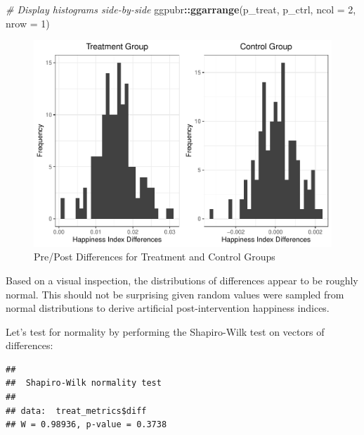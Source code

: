 \documentclass[]{book}
\newenvironment{Shaded}{\begin{snugshade}}{\end{snugshade}}
\newcommand{\CommentTok}[1]{\textcolor[rgb]{0.56,0.35,0.01}{\textit{#1}}}
\newcommand{\DataTypeTok}[1]{\textcolor[rgb]{0.13,0.29,0.53}{#1}}
\newcommand{\DecValTok}[1]{\textcolor[rgb]{0.00,0.00,0.81}{#1}}
\newcommand{\KeywordTok}[1]{\textcolor[rgb]{0.13,0.29,0.53}{\textbf{#1}}}
\newcommand{\NormalTok}[1]{#1}
\newcommand{\OperatorTok}[1]{\textcolor[rgb]{0.81,0.36,0.00}{\textbf{#1}}}
\begin{document}
\begin{Shaded}
\begin{Highlighting}[]
\CommentTok{# Display histograms side-by-side}
\NormalTok{ggpubr}\OperatorTok{::}\KeywordTok{ggarrange}\NormalTok{(p_treat, p_ctrl, }\DataTypeTok{ncol =} \DecValTok{2}\NormalTok{, }\DataTypeTok{nrow =} \DecValTok{1}\NormalTok{)}
\end{Highlighting}
\end{Shaded}

\begin{figure}

{\centering \includegraphics{The_People_Analytics_Companion_files/figure-latex/pre-post-diff-1} 

}

\caption{Pre/Post Differences for Treatment and Control Groups}\label{fig:pre-post-diff}
\end{figure}

Based on a visual inspection, the distributions of differences appear to be roughly normal. This should not be surprising given random values were sampled from normal distributions to derive artificial post-intervention happiness indices.

Let's test for normality by performing the Shapiro-Wilk test on vectors of differences:

\begin{Shaded}
\end{Shaded}

\begin{verbatim}
## 
##  Shapiro-Wilk normality test
## 
## data:  treat_metrics$diff
## W = 0.98936, p-value = 0.3738
\end{verbatim}
\end{document}
